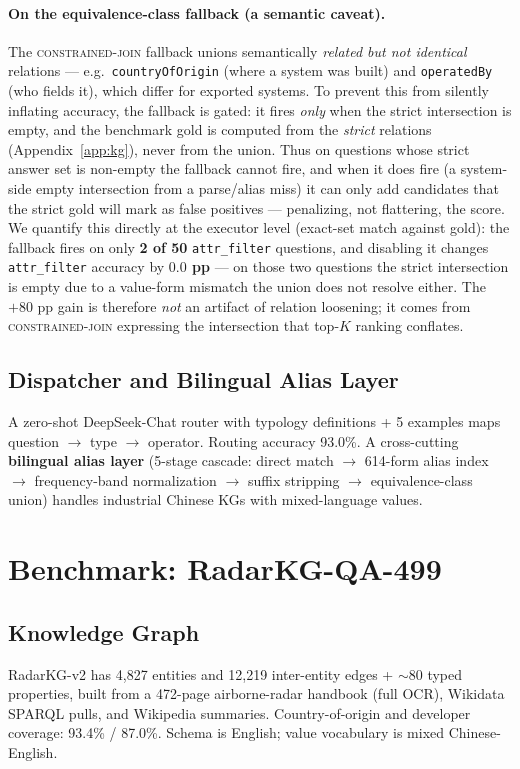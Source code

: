 \documentclass[review]{elsarticle}
\newcommand{\qtype}[1]{\texttt{\small #1}}
\newcommand{\op}[1]{\textsc{\small #1}}
\begin{document}
\paragraph{On the equivalence-class fallback (a semantic caveat).}
The \op{constrained-join} fallback unions semantically \emph{related but not identical} relations --- e.g.\ \texttt{countryOfOrigin} (where a system was built) and \texttt{operatedBy} (who fields it), which differ for exported systems. To prevent this from silently inflating accuracy, the fallback is gated: it fires \emph{only} when the strict intersection is empty, and the benchmark gold is computed from the \emph{strict} relations (Appendix~\ref{app:kg}), never from the union. Thus on questions whose strict answer set is non-empty the fallback cannot fire, and when it does fire (a system-side empty intersection from a parse/alias miss) it can only add candidates that the strict gold will mark as false positives --- penalizing, not flattering, the score. We quantify this directly at the executor level (exact-set match against gold): the fallback fires on only \textbf{2 of 50} \qtype{attr\_filter} questions, and disabling it changes \qtype{attr\_filter} accuracy by \textbf{$0.0$ pp} --- on those two questions the strict intersection is empty due to a value-form mismatch the union does not resolve either. The $+80$ pp gain is therefore \emph{not} an artifact of relation loosening; it comes from \op{constrained-join} expressing the intersection that top-$K$ ranking conflates.

\subsection{Dispatcher and Bilingual Alias Layer}
A zero-shot DeepSeek-Chat router with typology definitions + 5 examples maps question $\to$ type $\to$ operator. Routing accuracy 93.0\%. A cross-cutting \textbf{bilingual alias layer} (5-stage cascade: direct match $\to$ 614-form alias index $\to$ frequency-band normalization $\to$ suffix stripping $\to$ equivalence-class union) handles industrial Chinese KGs with mixed-language values.

\section{Benchmark: RadarKG-QA-499}
\label{sec:benchmark}

\subsection{Knowledge Graph}
RadarKG-v2 has 4{,}827 entities and 12{,}219 inter-entity edges + ${\sim}80$ typed properties, built from a 472-page airborne-radar handbook (full OCR), Wikidata SPARQL pulls, and Wikipedia summaries. Country-of-origin and developer coverage: 93.4\% / 87.0\%. Schema is English; value vocabulary is mixed Chinese-English.
\end{document}
